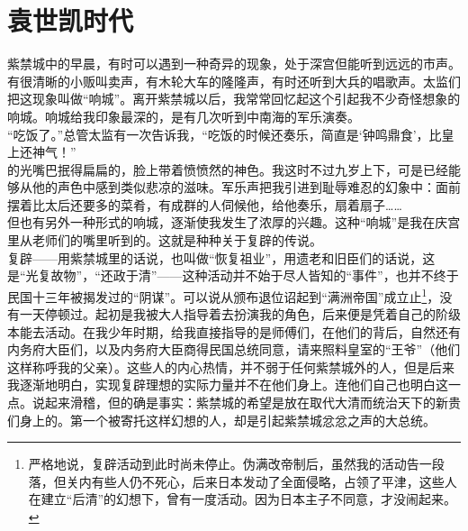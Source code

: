 \fancyhead[RO]{\thepage} %
\fancyhead[LE]{\thepage} %
\chapter*{袁世凯时代}
紫禁城中的早晨，有时可以遇到一种奇异的现象，处于深宫但能听到远远的市声。有很清晰的小贩叫卖声，有木轮大车的隆隆声，有时还听到大兵的唱歌声。太监们把这现象叫做“响城”。离开紫禁城以后，我常常回忆起这个引起我不少奇怪想象的响城。响城给我印象最深的，是有几次听到中南海的军乐演奏。\\

“吃饭了。”总管太监有一次告诉我，“吃饭的时候还奏乐，简直是‘钟鸣鼎食’，比皇上还神气！”\\

的光嘴巴抿得扁扁的，脸上带着愤愤然的神色。我这时不过九岁上下，可是已经能够从他的声色中感到类似悲凉的滋味。军乐声把我引进到耻辱难忍的幻象中：面前摆着比太后还要多的菜肴，有成群的人伺候他，给他奏乐，扇着扇子……\\

但也有另外一种形式的响城，逐渐使我发生了浓厚的兴趣。这种“响城”是我在庆宫里从老师们的嘴里听到的。这就是种种关于复辟的传说。\\

复辟——用紫禁城里的话说，也叫做“恢复祖业”，用遗老和旧臣们的话说，这是“光复故物”，“还政于清”——这种活动并不始于尽人皆知的“事件”，也并不终于民国十三年被揭发过的“阴谋”。可以说从颁布退位诏起到“满洲帝国”成立止\footnote{严格地说，复辟活动到此时尚未停止。伪满改帝制后，虽然我的活动告一段落，但关内有些人仍不死心，后来日本发动了全面侵略，占领了平津，这些人在建立“后清”的幻想下，曾有一度活动。因为日本主子不同意，才没闹起来。}，没有一天停顿过。起初是我被大人指导着去扮演我的角色，后来便是凭着自己的阶级本能去活动。在我少年时期，给我直接指导的是师傅们，在他们的背后，自然还有内务府大臣们，以及内务府大臣商得民国总统同意，请来照料皇室的“王爷”（他们这样称呼我的父亲）。这些人的内心热情，并不弱于任何紫禁城外的人，但是后来我逐渐地明白，实现复辟理想的实际力量并不在他们身上。连他们自己也明白这一点。说起来滑稽，但的确是事实：紫禁城的希望是放在取代大清而统治天下的新贵们身上的。第一个被寄托这样幻想的人，却是引起紫禁城忿忿之声的大总统。\\

